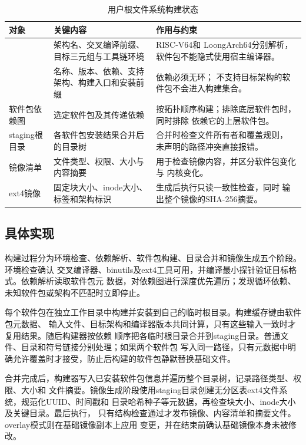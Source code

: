 \begin{table}[htbp]
  \centering
  \caption{用户根文件系统构建状态}
  \label{tab:user-rootfs-state}
  \begin{tabularx}{\textwidth}{L{3.4cm}L{4.8cm}Y}
    \toprule
    对象 & 关键内容 & 作用与约束 \\
    \midrule
     & 架构名、交叉编译前缀、目标三元组与工具链环境 & RISC-V64和
    LoongArch64分别解析，软件包不能隐式使用宿主编译器。\\
     & 名称、版本、依赖、支持架构、构建入口和安装前缀 & 依赖必须无环；
    不支持目标架构的软件包不会进入构建集合。\\
    软件包依赖图 & 选定软件包及其传递依赖 & 按拓扑顺序构建；排除底层软件包时，同时排除
    依赖它的上层软件包。\\
    staging根目录 & 各软件包安装结果合并后的目录树 & 合并时检查文件所有者和覆盖规则，
    未声明的路径冲突直接报错。\\
    镜像清单 & 文件类型、权限、大小与内容摘要 & 用于检查镜像内容，并区分软件包变化与
    内核变化。\\
    ext4镜像 & 固定块大小、inode大小、标签和架构标识 & 生成后执行只读一致性检查，同时
    输出整个镜像的SHA-256摘要。\\
    \bottomrule
  \end{tabularx}
\end{table}

\subsection{具体实现}

构建过程分为环境检查、依赖解析、软件包构建、目录合并和镜像生成五个阶段。环境检查确认
交叉编译器、binutils及ext4工具可用，并编译最小探针验证目标格式。依赖解析读取软件包元
数据，对依赖图进行深度优先遍历；发现循环依赖、未知软件包或架构不匹配时立即停止。

每个软件包在独立工作目录中构建并安装到自己的临时根目录。构建缓存键由软件包元数据、
输入文件、目标架构和编译器版本共同计算，只有这些输入一致时才复用结果。随后构建器按依赖
顺序把各临时根目录合并到staging目录。普通文件、目录和符号链接分别处理；如果两个软件包
写入同一路径，只有元数据中明确允许覆盖时才接受，防止后构建的软件包静默替换基础文件。

合并完成后，构建器写入已安装软件包信息并遍历整个目录树，记录路径类型、权限、大小和
文件摘要。镜像生成阶段使用staging目录创建无分区表ext4文件系统，规范化UUID、时间戳和
目录哈希种子等元数据，再检查块大小、inode大小及关键目录。最后执行，
只有结构检查通过才发布镜像、内容清单和摘要文件。overlay模式则在基础镜像副本上应用
变更，并在结束前确认基础镜像本身未被修改。

